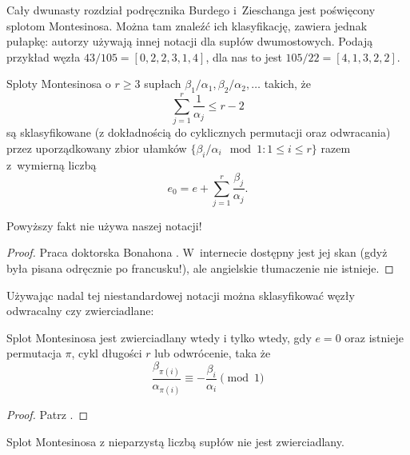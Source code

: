 Cały dwunasty rozdział podręcznika Burdego i~Zieschanga \cite{burde14} jest poświęcony splotom Montesinosa.
%
%
Można tam znaleźć ich klasyfikację, zawiera jednak pułapkę: autorzy używają innej notacji dla supłów dwumostowych.
Podają przykład węzła $43/105 = [0, 2, 2, 3, 1, 4]$, dla nas to jest $105/22 = [4, 1, 3, 2, 2]$.

\begin{proposition}
    Sploty Montesinosa o $r \ge 3$ supłach $\beta_1/\alpha_1, \beta_2/\alpha_2, \ldots$ takich, że
    \begin{equation}
        \sum_{j=1}^r \frac{1}{\alpha_j} \le r - 2
    \end{equation}
    są sklasyfikowane (z dokładnością do cyklicznych permutacji oraz odwracania) przez uporządkowany zbior ułamków $\{\beta_i/\alpha_i \mod 1 : 1 \le i \le r\}$ razem z~wymierną liczbą
    \begin{equation}
        e_0 = e + \sum_{j=1}^r \frac{\beta_j}{\alpha_j}.
    \end{equation}
\end{proposition}

Powyższy fakt nie używa naszej notacji!

\begin{proof}
    Praca doktorska Bonahona \cite{bonahon79}.
    W~internecie dostępny jest jej skan (gdyż była pisana odręcznie po francusku!), ale angielskie tłumaczenie nie istnieje.
\end{proof}

Używając nadal tej niestandardowej notacji można sklasyfikować węzły odwracalny czy zwierciadlane:

\begin{proposition}
%
    Splot Montesinosa jest zwierciadlany wtedy i tylko wtedy, gdy $e = 0$ oraz istnieje permutacja $\pi$, cykl długości $r$ lub odwrócenie, taka że
    \begin{equation}
        \frac{\beta_{\pi(i)}}{\alpha_{\pi(i)}} \equiv -\frac{\beta_i}{\alpha_i} \pmod 1
    \end{equation}
\end{proposition}

\begin{proof}
    Patrz \cite[s. 230]{burde14}.
\end{proof}

\begin{corollary}
    Splot Montesinosa z nieparzystą liczbą supłów nie jest zwierciadlany.
\end{corollary}

